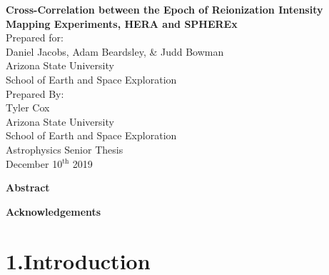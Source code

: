 \documentclass[12pt]{article}
\begin{document}
\doublespacing
\thispagestyle{empty}
\newpage
{}

\begin{center}
	{\Large \textbf{Cross-Correlation between the Epoch of Reionization Intensity Mapping Experiments, HERA and SPHEREx}} \\
	[0.15\textheight]

	Prepared for: \\
	Daniel Jacobs, Adam Beardsley, \& Judd Bowman \\
	Arizona State University \\
	School of Earth and Space Exploration \\[0.15\textheight]

	Prepared By: \\
	Tyler Cox \\
	Arizona State University \\
	School of Earth and Space Exploration \\
	Astrophysics Senior Thesis \\
	December 10$^{\textrm{th}}$ 2019 \\
	[0.15\textheight]

\end{center}
\thispagestyle{empty}

\clearpage
{}

\begin{center}
	\textbf{Abstract}
\end{center}



\begingroup
\hypersetup{
	citecolor=DarkBlue,
	filecolor=black,
	linkcolor=black,
	urlcolor=DarkBlue
}
\renewcommand{\thesection}{\Roman{section}}
\tableofcontents
\listoffigures
\endgroup

\newpage

	\begin{center}
		\textbf{Acknowledgements}
	\end{center}

		




\tocless\section{\hypertarget{sec:introduction}{1.\hspace{0.75em}Introduction}}
\end{document}
